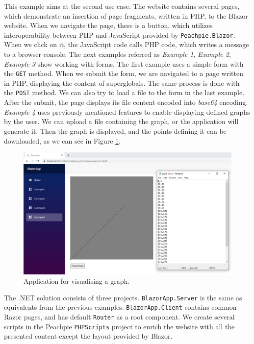 This example aims at the second use case.
The website contains several pages, which demonstrate an insertion of page fragments, written in PHP, to the Blazor website.
When we navigate the page, there is a button, which utilizes interoperability between PHP and JavaScript provided by \texttt{Peachpie.Blazor}.
When we click on it, the JavaScript code calls PHP code, which writes a message to a browser console.
The next examples referred as \textit{Example 1}, \textit{Example 2}, \textit{Example 3} show working with forms.
The first example uses a simple form with the \texttt{GET} method.
When we submit the form, we are navigated to a page written in PHP, displaying the content of superglobals.
The same process is done with the \texttt{POST} method.
We can also try to load a file to the form in the last example.
After the submit, the page displays its file content encoded into \textit{base64} encoding.
\textit{Example 4} uses previously mentioned features to enable displaying defined graphs by the user.
We can upload a file containing the graph, or the application will generate it.
Then the graph is displayed, and the points defining it can be downloaded, as we can see in Figure \ref{img27:graph}.
\par
\begin{figure}[b!]
\centering
\includegraphics[scale=0.4]{./img/graph}
\caption{Application for visualising a graph.}
\label{img27:graph}
\end{figure} 
\par
The .NET solution consists of three projects.
\texttt{BlazorApp.Server} is the same as equivalents from the previous examples.
\texttt{BlazorApp.Client} contains common Razor pages, and has default \texttt{Router} as a root component.
We create several scripts in the Peachpie \texttt{PHPScripts} project to enrich the website with all the presented content except the layout provided by Blazor.
